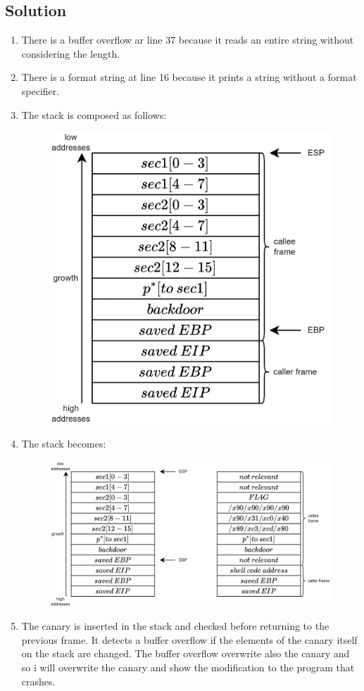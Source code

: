 \subsection*{Solution}
\begin{enumerate}
    \item There is a buffer overflow ar line 37 because it reads an entire string without considering the length. 
    \item There is a format string at line 16 because it prints a string without a format specifier. 
    \item The stack is composed as follows: 
        \begin{figure}[H]
            \centering
            \includegraphics[width=0.5\linewidth]{images/stack10.png}
        \end{figure}
    \item The stack becomes: 
        \begin{figure}[H]
            \centering
            \includegraphics[width=0.8\linewidth]{images/stack11.png}
        \end{figure}
    \item The canary is inserted in the stack and checked before returning to the previous frame. 
        It detects a buffer overflow if the elements of the canary itself on the stack are changed. 
        The buffer overflow overwrite also the canary and so i will overwrite the canary and show the modification to the program that crashes. 

\end{enumerate}
